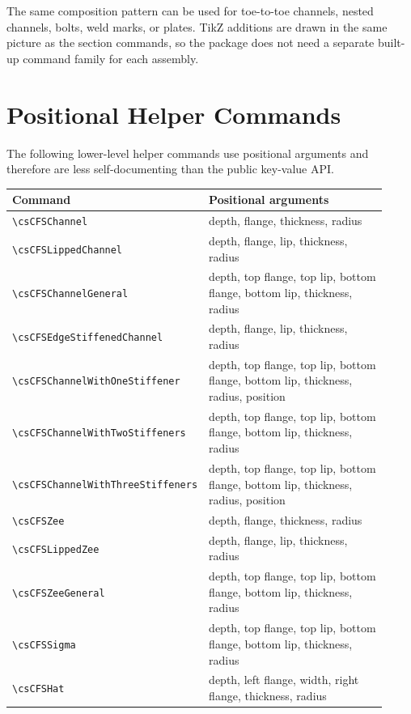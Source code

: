 \documentclass[10pt]{article}
\newcommand{\smallcommand}[1]{{\scriptsize\texttt{\textbackslash #1}}}
\begin{document}
The same composition pattern can be used for toe-to-toe channels, nested
channels, bolts, weld marks, or plates. TikZ additions are drawn in the same
picture as the section commands, so the package does not need a separate
built-up command family for each assembly.

\section{Positional Helper Commands}

The following lower-level helper commands use positional
arguments and therefore are less self-documenting than the public key-value API.

\begin{footnotesize}
\begin{longtable}{@{}L{0.39\linewidth}L{0.53\linewidth}@{}}
\toprule
Command & Positional arguments \\
\midrule
\smallcommand{csCFSChannel} & depth, flange, thickness, radius \\
\smallcommand{csCFSLippedChannel} & depth, flange, lip, thickness, radius \\
\smallcommand{csCFSChannelGeneral} & depth, top flange, top lip, bottom flange, bottom lip, thickness, radius \\
\smallcommand{csCFSEdgeStiffenedChannel} & depth, flange, lip, thickness, radius \\
\smallcommand{csCFSChannelWithOneStiffener} & depth, top flange, top lip, bottom flange, bottom lip, thickness, radius, position \\
\smallcommand{csCFSChannelWithTwoStiffeners} & depth, top flange, top lip, bottom flange, bottom lip, thickness, radius \\
\smallcommand{csCFSChannelWithThreeStiffeners} & depth, top flange, top lip, bottom flange, bottom lip, thickness, radius, position \\
\smallcommand{csCFSZee} & depth, flange, thickness, radius \\
\smallcommand{csCFSLippedZee} & depth, flange, lip, thickness, radius \\
\smallcommand{csCFSZeeGeneral} & depth, top flange, top lip, bottom flange, bottom lip, thickness, radius \\
\smallcommand{csCFSSigma} & depth, top flange, top lip, bottom flange, bottom lip, thickness, radius \\
\smallcommand{csCFSHat} & depth, left flange, width, right flange, thickness, radius \\

\end{longtable}
\end{footnotesize}
\end{document}
